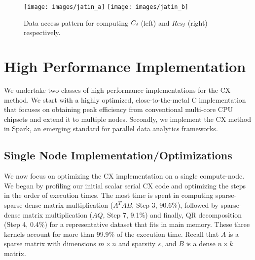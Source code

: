 
\begin{figure*}[htp]
\texttt{[image: images/jatin\_a]}
\texttt{[image: images/jatin\_b]}
\caption{ Data access pattern for computing ${C}_{\it{i}}$ (left) and {\it{Res}}$_{\it{j}}$ (right) respectively.}
\label{fig:access_pattern}
\end{figure*}

\section{High Performance Implementation}
\label{sec:implementation}

We undertake two classes of high performance implementations for the CX method. 
We start with a highly optimized, close-to-the-metal C implementation
that focuses on obtaining peak efficiency from conventional multi-core
CPU chipsets and extend it to multiple nodes. 
Secondly, we implement the CX method in Spark, an emerging standard for parallel data analytics frameworks. 



\subsection {Single Node Implementation/Optimizations}
\label{sxn:single_node_opt}

    We now focus on optimizing the CX implementation on a single
    compute-node.
    We began by profiling our initial %
    scalar serial CX
    code and optimizing the steps in the order of execution times.
    The most time is spent in computing sparse-sparse-dense matrix
    multiplication ($A^TAB$, Step 3, 90.6\%), followed by  sparse-dense matrix
    multiplication ($AQ$, Step 7, 9.1\%) and finally, QR
    decomposition (Step 4, 0.4\%)
    for a representative dataset that fits in main memory. These
    three kernels account for more than 99.9\% of
    the execution time.
    Recall that $A$ is a sparse matrix with dimensions
    $m \times n$
    and sparsity $s$, and $B$ is a dense $n \times k$ matrix.

